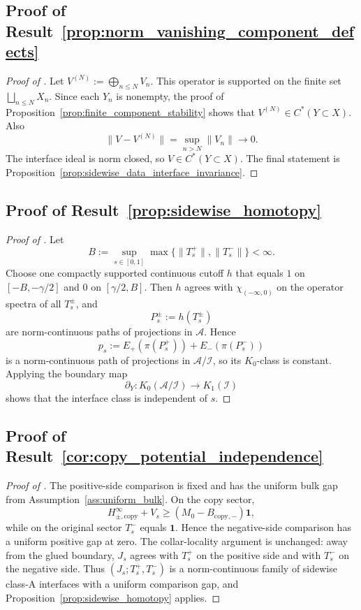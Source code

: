 \documentclass[11pt]{article}
\numberwithin{equation}{section}
\theoremstyle{definition}
\theoremstyle{remark}
\newcommand{\Id}{\mathbf{1}}
\begin{document}
\subsection{Proof of Result~\ref{prop:norm_vanishing_component_defects}}\label{app:proof:prop:norm_vanishing_component_defects}
\begin{proof}[Proof of ]
Let \(V^{(N)}:=\bigoplus_{n\le N}V_n\). This operator is supported on the finite set
\(\bigsqcup_{n\le N}X_n\). Since each \(Y_n\) is nonempty, the proof of
Proposition~\ref{prop:finite_component_stability} shows that \(V^{(N)}\in C^*(Y\subset X)\). Also
\[
\|V-V^{(N)}\|=\sup_{n>N}\|V_n\|\longrightarrow0.
\]
The interface ideal is norm closed, so \(V\in C^*(Y\subset X)\). The final statement is
Proposition~\ref{prop:sidewise_data_interface_invariance}.
\end{proof}

\subsection{Proof of Result~\ref{prop:sidewise_homotopy}}\label{app:proof:prop:sidewise_homotopy}
\begin{proof}[Proof of ]
Let
\[
B:=\sup_{s\in[0,1]}\max\{\|T_s^+\|,\|T_s^-\|\}<\infty.
\]
Choose one compactly supported continuous cutoff $h$ that equals $1$ on
$[-B,-\gamma/2]$ and $0$ on $[\gamma/2,B]$. Then $h$ agrees with
$\chi_{(-\infty,0)}$ on the operator spectra of all $T_s^\pm$, and
\[
P_s^\pm:=h(T_s^\pm)
\]
are norm-continuous paths of projections in $\mathcal A$. Hence
\[
p_s:=E_+(\pi(P_s^+))+E_-(\pi(P_s^-))
\]
is a norm-continuous path of projections in $\mathcal A/\mathcal I$, so its $K_0$-class is
constant. Applying the boundary map
\[
\partial_Y:K_0(\mathcal A/\mathcal I)\to K_1(\mathcal I)
\]
shows that the interface class is independent of $s$.
\end{proof}

\subsection{Proof of Result~\ref{cor:copy_potential_independence}}\label{app:proof:cor:copy_potential_independence}
\begin{proof}[Proof of ]
The positive-side comparison is fixed and has the uniform bulk gap from Assumption~\ref{ass:uniform_bulk}. On the copy sector,
\[
H_{\pm,\mathrm{copy}}^\infty+V_s\ge (M_0-B_{\mathrm{copy},-})\Id,
\]
while on the original sector $T_s^-$ equals $\Id$. Hence the negative-side comparison has a
uniform positive gap at zero. The collar-locality argument is unchanged: away from the glued
boundary, $J_s$ agrees with $T_s^+$ on the positive side and with $T_s^-$ on the negative side.
Thus $(J_s;T_s^+,T_s^-)$ is a norm-continuous family of sidewise class-A interfaces with a uniform
comparison gap, and Proposition~\ref{prop:sidewise_homotopy} applies.
\end{proof}
\end{document}
